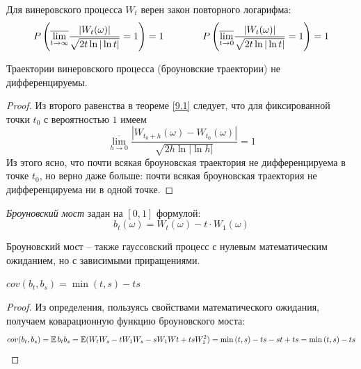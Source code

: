 \begin{theorem}\label{9.1}
Для винеровского процесса $W_t$ верен закон повторного логарифма:
\begin{equation*}
    P\left({\overline{\lim\limits_{t \to \infty}}\frac{|W_t(\omega)|}{\sqrt{2t\ln |\ln t|}} = 1}\right) = 1 \qquad \qquad 
     P\left({\overline{\lim\limits_{t \to 0}}\frac{|W_t(\omega)|}{\sqrt{2t\ln |\ln t|}} = 1}\right) = 1
\end{equation*}
\end{theorem}

\begin{statement}
    Траектории винеровского процесса (броуновские траектории) не дифференцируемы.
\end{statement}

\begin{proof}
    Из второго равенства в теореме \ref{9.1} следует, что для фиксированной точки $t_0$ с вероятностью $1$ имеем
    \begin{equation*}
        \overline{\lim\limits_{h\to 0}}\frac{|W_{t_0+h}(\omega)-W_{t_0}(\omega)|}{\sqrt{2h\ln |\ln h|}} = 1
    \end{equation*}
    Из этого ясно, что почти всякая броуновская траектория не дифференцируема в точке $t_0$, но верно даже больше: почти всякая броуновская траектория не дифференцируема ни в одной точке.
\end{proof}

\begin{definition}
    \textit{Броуновский мост} задан на $[0,1]$ формулой:
    \begin{equation*}
        b_t(\omega) = W_t(\omega) - t\cdot W_1(\omega)
    \end{equation*}
\end{definition}


\begin{note}
    Броуновский мост -- также гауссовский процесс с нулевым математическим ожиданием, но с зависимыми приращениями.

\end{note}

\begin{statement}
    $cov(b_t, b_s) = \min{(t, s)} - ts$
\end{statement}

\begin{proof}
    Из определения, пользуясь свойствами математического ожидания, получаем коварационную функцию броуновского моста:
    \begin{equation*}
        cov(b_t, b_s) = \operatorname{\mathbb{E}} b_tb_s = \operatorname{\mathbb{E}} (W_tW_s - tW_1W_s - sW_1Wt + tsW_1^2) = \min{(t, s)} - ts - st + ts = \min{(t, s)} - ts
    \end{equation*}
\end{proof}


